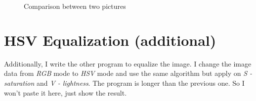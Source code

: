 \documentclass[12pt,twoside,a4paper]{article}
\begin{document}
\begin{figure}[H]
\centering
{}
\hfill
{}
\caption{Comparison between two pictures}
\end{figure}

\section{HSV Equalization (additional)}
Additionally, I write the other program to equalize the image. I change the image data from \textit{RGB} mode to \textit{HSV} mode and use the same algorithm but apply on \textit{S - saturation} and \textit{V - lightness}. The program is longer than the previous one. So I won't paste it here, just show the result.
\end{document}
